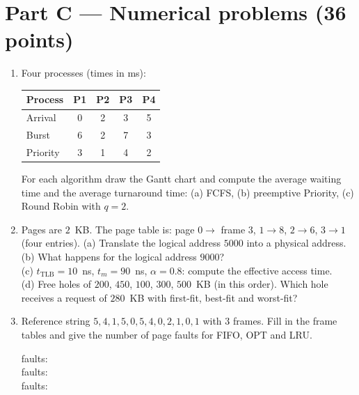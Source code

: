 \documentclass[11pt,a4paper]{article}
\begin{document}
\section*{Part C --- Numerical problems \hfill (36 points)}
\begin{enumerate}[leftmargin=1.8em,label=C\arabic*.]
  \item Four processes (times in ms):
  \begin{center}
  \begin{tabular}{lcccc}
  \toprule
  Process & P1 & P2 & P3 & P4 \\ \midrule
  Arrival & 0 & 2 & 3 & 5 \\
  Burst & 6 & 2 & 7 & 3 \\
  Priority & 3 & 1 & 4 & 2 \\ \bottomrule
  \end{tabular}
  \end{center}
  For each algorithm draw the Gantt chart and compute the average waiting time and the average turnaround time: (a) FCFS, (b) preemptive Priority, (c) Round Robin with $q = 2$. 
  \ans{4.6cm}
  \item Pages are $2$~KB. The page table is: page $0 \to$ frame $3$, $1 \to 8$, $2 \to 6$, $3 \to 1$ (four entries).
  (a) Translate the logical address $5000$ into a physical address. \\
  (b) What happens for the logical address $9000$? \\
  (c) $t_{\text{TLB}} = 10$~ns, $t_m = 90$~ns, $\alpha = 0.8$: compute the effective access time. \\
  (d) Free holes of $200$, $450$, $100$, $300$, $500$~KB (in this order). Which hole receives a request of $280$~KB with first-fit, best-fit and worst-fit? 
  \ans{5.2cm}
  \item Reference string $5, 4, 1, 5, 0, 5, 4, 0, 2, 1, 0, 1$ with $3$ frames. Fill in the frame tables and give the number of page faults for FIFO, OPT and LRU. 
  \begin{center}
  \small\renewcommand{\arraystretch}{1.2}
  \quad faults: \underline{\hspace{1.2cm}}\\[0.5em]
  \quad faults: \underline{\hspace{1.2cm}}\\[0.5em]
  \quad faults: \underline{\hspace{1.2cm}}

\end{center}
\end{enumerate}
\end{document}
